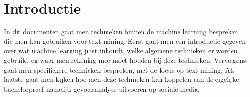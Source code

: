 \chapter{Introductie}\label{introductie}
In dit documenten gaat men technieken binnen de machine learning bespreken die men kan gebruiken voor text mining. Eerst gaat men een introductie gegeven over wat machine learning juist inhoudt, welke algemene technieken er worden gebruikt en waar men rekening mee moet houden bij deze technieken. Vervolgens gaat men specifiekere technieken bespreken, met de focus op text mining. Als laatste gaat men kijken hoe men deze technieken kan koppelen aan de eigelijke bachelorproef namelijk gevoelsanalyse uitvoeren op sociale media.
